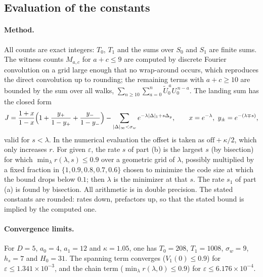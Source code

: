 \documentclass[11pt]{amsart}
\theoremstyle{definition}
\theoremstyle{remark}
\numberwithin{equation}{section}
\newcommand{\eps}{\varepsilon}
\newcommand{\Ut}{\tilde U_0}
\begin{document}
\subsection{Evaluation of the constants}\label{s1:sec:numbers}
\paragraph{Method.} All counts are exact integers: $T_0$, $T_1$ and the sums over $S_0$ and $S_1$ are finite sums. The witness counts $M_{a,c}$ for $a+c\le9$ are computed by discrete Fourier convolution on a grid large enough that no wrap-around occurs, which reproduces the direct convolution up to rounding; the remaining terms with $a+c\ge10$ are bounded by the sum over all walks, $\sum_{n\ge10}\sum_{a=0}^n\Ut^{\,a}U_0^{\,n-a}$. The landing sum has the closed form
\[
J=\frac{1+x}{1-x}\Bigl(1+\frac{y_+}{1-y_+}+\frac{y_-}{1-y_-}\Bigr)-\sum_{|\Delta|_\infty<\sigma_w}e^{-\lambda|\Delta|_1+s\Delta_y},\qquad x=e^{-\lambda},\ y_\pm=e^{-(\lambda\mp s)},
\]
valid for $s<\lambda$. In the numerical evaluation the offset is taken as $\mathrm{off}+\kappa/2$, which only increases $r$. For given $\eps$, the rate $s$ of part (b) is the largest $s$ (by bisection) for which $\min_\lambda r(\lambda,s)\le0.9$ over a geometric grid of $\lambda$, possibly multiplied by a fixed fraction in $\{1,0.9,0.8,0.7,0.6\}$ chosen to minimize the code size at which the bound drops below $0.1$; then $\lambda$ is the minimizer at that $s$. The rate $s_1$ of part (a) is found by bisection. All arithmetic is in double precision. The stated constants are rounded: rates down, prefactors up, so that the stated bound is implied by the computed one.

\paragraph{Convergence limits.} For $D=5$, $a_0=4$, $a_1=12$ and $\kappa=1.05$, one has $T_0=208$, $T_1=1008$, $\sigma_w=9$, $h_s=7$ and $H_0=31$. The spanning term converges ($V_1(0)\le0.9$) for $\eps\le1.341\times10^{-3}$, and the chain term ($\min_\lambda r(\lambda,0)\le0.9$) for $\eps\le6.176\times10^{-4}$.
\end{document}
